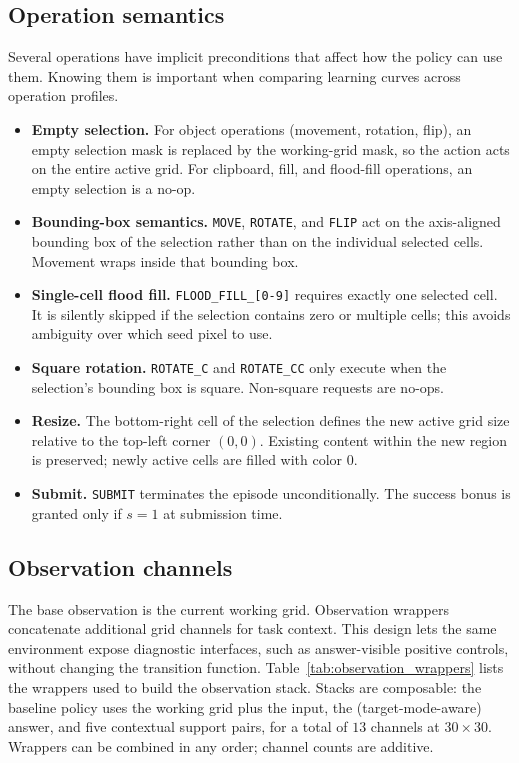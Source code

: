 \subsection{Operation semantics}
\label{app:op_semantics}

Several operations have implicit preconditions that affect how the policy can use them. Knowing them is important when comparing learning curves across operation profiles.

\begin{itemize}
    \item \textbf{Empty selection.} For object operations (movement, rotation, flip), an empty selection mask is replaced by the working-grid mask, so the action acts on the entire active grid. For clipboard, fill, and flood-fill operations, an empty selection is a no-op.
    \item \textbf{Bounding-box semantics.} \texttt{MOVE}, \texttt{ROTATE}, and \texttt{FLIP} act on the axis-aligned bounding box of the selection rather than on the individual selected cells. Movement wraps inside that bounding box.
    \item \textbf{Single-cell flood fill.} \texttt{FLOOD\_FILL\_[0-9]} requires exactly one selected cell. It is silently skipped if the selection contains zero or multiple cells; this avoids ambiguity over which seed pixel to use.
    \item \textbf{Square rotation.} \texttt{ROTATE\_C} and \texttt{ROTATE\_CC} only execute when the selection's bounding box is square. Non-square requests are no-ops.
    \item \textbf{Resize.} The bottom-right cell of the selection defines the new active grid size relative to the top-left corner $(0,0)$. Existing content within the new region is preserved; newly active cells are filled with color $0$.
    \item \textbf{Submit.} \texttt{SUBMIT} terminates the episode unconditionally. The success bonus is granted only if $s=1$ at submission time.
\end{itemize}

\subsection{Observation channels}
\label{app:observation_wrappers}

The base observation is the current working grid. Observation wrappers concatenate additional grid channels for task context. This design lets the same environment expose diagnostic interfaces, such as answer-visible positive controls, without changing the transition function. Table~\ref{tab:observation_wrappers} lists the wrappers used to build the observation stack. Stacks are composable: the baseline policy uses the working grid plus the input, the (target-mode-aware) answer, and five contextual support pairs, for a total of $13$ channels at $30 \times 30$. Wrappers can be combined in any order; channel counts are additive.

